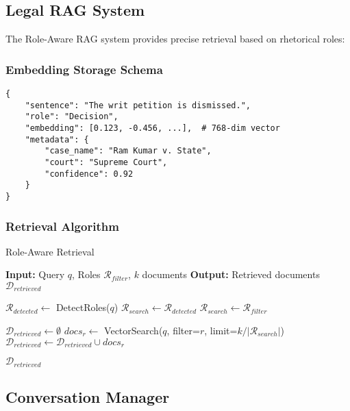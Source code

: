 \documentclass[12pt,a4paper]{article}
\begin{document}
\subsection{Legal RAG System}

The Role-Aware RAG system provides precise retrieval based on rhetorical roles:

\subsubsection{Embedding Storage Schema}

\begin{lstlisting}[caption={Role-Tagged Document Structure}]
{
    "sentence": "The writ petition is dismissed.",
    "role": "Decision",
    "embedding": [0.123, -0.456, ...],  # 768-dim vector
    "metadata": {
        "case_name": "Ram Kumar v. State",
        "court": "Supreme Court",
        "confidence": 0.92
    }
}
\end{lstlisting}

\subsubsection{Retrieval Algorithm}

\begin{algorithm}
\caption{Role-Aware Retrieval}
\begin{algorithmic}[1]
\STATE \textbf{Input:} Query $q$, Roles $\mathcal{R}_{filter}$, $k$ documents
\STATE \textbf{Output:} Retrieved documents $\mathcal{D}_{retrieved}$

\STATE $\mathcal{R}_{detected} \leftarrow$ DetectRoles($q$)
    \STATE $\mathcal{R}_{search} \leftarrow \mathcal{R}_{detected}$
\ELSE
    \STATE $\mathcal{R}_{search} \leftarrow \mathcal{R}_{filter}$
\ENDIF

\STATE $\mathcal{D}_{retrieved} \leftarrow \emptyset$
    \STATE $docs_r \leftarrow$ VectorSearch($q$, filter=$r$, limit=$k/|\mathcal{R}_{search}|$)
    \STATE $\mathcal{D}_{retrieved} \leftarrow \mathcal{D}_{retrieved} \cup docs_r$
\ENDFOR

\RETURN $\mathcal{D}_{retrieved}$
\end{algorithmic}
\end{algorithm}

\subsection{Conversation Manager}
\end{document}
